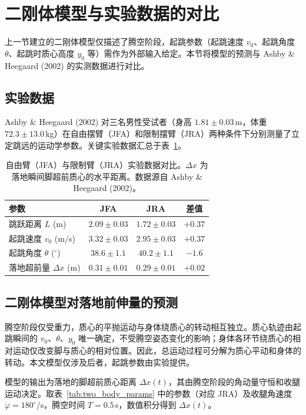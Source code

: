 \documentclass{article}
\begin{document}
\section{二刚体模型与实验数据的对比}

上一节建立的二刚体模型仅描述了腾空阶段，起跳参数（起跳速度 $v_0$、起跳角度 $\theta$、起跳时质心高度 $y_0$ 等）需作为外部输入给定。本节将模型的预测与 Ashby \& Heegaard (2002) 的实测数据进行对比。

\subsection{实验数据}

Ashby \& Heegaard (2002) 对三名男性受试者（身高 $1.81\pm0.03$\,m，体重 $72.3\pm13.0$\,kg）在自由摆臂（JFA）和限制摆臂（JRA）两种条件下分别测量了立定跳远的运动学参数。关键实验数据汇总于表~\ref{tab:exp_data}。

\begin{table}[h]
\centering
\caption{自由臂（JFA）与限制臂（JRA）实验数据对比。$\Delta x$ 为落地瞬间脚超前质心的水平距离。数据源自 Ashby \& Heegaard (2002)。}
\label{tab:exp_data}
\begin{tabular}{lccc}
\toprule
参数 & JFA & JRA & 差值 \\
\midrule
跳跃距离 $L$ (m) & $2.09\pm0.03$ & $1.72\pm0.03$ & $+0.37$ \\
起跳速度 $v_0$ (m/s) & $3.32\pm0.03$ & $2.95\pm0.03$ & $+0.37$ \\
起跳角度 $\theta$ ($^\circ$) & $38.6\pm1.1$ & $40.2\pm1.1$ & $-1.6$ \\
落地超前量 $\Delta x$ (m) & $0.31\pm0.01$ & $0.29\pm0.01$ & $+0.02$ \\
\bottomrule
\end{tabular}
\end{table}

\subsection{二刚体模型对落地前伸量的预测}

腾空阶段仅受重力，质心的平抛运动与身体绕质心的转动相互独立。质心轨迹由起跳瞬间的 $v_0$、$\theta$、$y_0$ 唯一确定，不受腾空姿态变化的影响；身体各环节绕质心的相对运动仅改变脚与质心的相对位置。因此，总运动过程可分解为质心平动和身体的转动。本文模型仅涉及后者，起跳参数由实验提供。

模型的输出为落地的脚超前质心距离 $\Delta x(t)$，其由腾空阶段的角动量守恒和收腿运动决定。取表~\ref{tab:two_body_params} 中的参数（对应 JRA）及收腿角速度 $\dot\varphi = 180^\circ/\text{s}$，腾空时间 $T=0.5$\,s，数值积分得到 $\Delta x(t)$。
\end{document}
